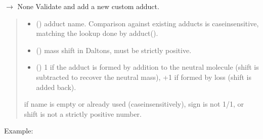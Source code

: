 \documentclass[letterpaper,10pt,english]{sphinxmanual}
\begin{document}
\begin{fulllineitems}
\label{\detokenize{api:utils.neutral_mass.add_adduct}}
\pysigstartsignatures
\pysiglinewithargsret
{}
{\sphinxparamcomma {}\sphinxparamcomma {}}
{{ $\rightarrow$ None}}
\pysigstopsignatures
\sphinxAtStartPar
Validate and add a new custom adduct.
\begin{quote}\begin{description}
\begin{itemize}
\item {} 
\sphinxAtStartPar
{} () \textendash{} adduct name. Comparison against existing adducts is
case\sphinxhyphen{}insensitive, matching the lookup done by adduct().

\item {} 
\sphinxAtStartPar
{} () \textendash{} mass shift in Daltons, must be strictly positive.

\item {} 
\sphinxAtStartPar
{} () \textendash{} \sphinxhyphen{}1 if the adduct is formed by addition to the neutral molecule
(shift is subtracted to recover the neutral mass), +1 if formed by loss
(shift is added back).

\end{itemize}

\sphinxAtStartPar
{} \textendash{} if name is empty or already used (case\sphinxhyphen{}insensitively),
sign is not \sphinxhyphen{}1/1, or shift is not a strictly positive number.

\end{description}\end{quote}

\sphinxAtStartPar
Example:


\end{fulllineitems}
\end{document}
